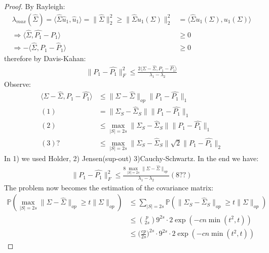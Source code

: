 \documentclass[a4paper,12pt, oneside, fleqn]{book}
\theoremstyle{definition}
\theoremstyle{remark}
\begin{document}
\begin{proof}
	By Rayleigh:
	\begin{align*}
		\lambda_{max}(\hat{\Sigma}) =  \langle \hat{\Sigma}\hat{u}_1, \hat{u}_1\rangle = \|\hat{\Sigma}\|_2^2 \ge \|\hat{\Sigma}u_1(\Sigma)\|_2^2 &= \langle \hat{\Sigma}u_1(\Sigma), u_1(\Sigma)\rangle \\
		\Rightarrow \langle\hat{\Sigma}, \hat{P_1}- P_1\rangle &\ge 0 \\
		\Rightarrow - \langle\hat{\Sigma}, P_1 - \hat{P}_1\rangle &\ge 0
	\end{align*}
	therefore by Davis-Kahan:
	\begin{align*}
		\|P_1 - \hat{P_1}\|_F^2 \le \frac{2\langle \Sigma - \hat{\Sigma}, P_1 - \hat{P_1}\rangle}{\lambda_1 - \lambda_2}
	\end{align*}
	Observe:
	\begin{align*}
		\langle \Sigma - \hat{\Sigma}, P_1 -\hat{P_1}\rangle &\le \|\Sigma - \hat{\Sigma}\|_{op} \|P_1 - \hat{P_1}\|_1\\
		(1)&= \|\Sigma_S - \hat{\Sigma}_S\|\|P_1 - \hat{P_1}\|_1\\
		(2)&\le  \max_{|S| = 2s}\|\Sigma_S - \hat{\Sigma}_S\|\|P_1 - \hat{P_1}\|_1\\
		(3)?&\le \max_{|S| = 2s}\|\Sigma_S - \hat{\Sigma}_S\|\sqrt{2}\|P_1 - \hat{P_1}\|_2
	\end{align*}
	In 1) we used Holder, 2) Jensen(sup-out) 3)Cauchy-Schwartz. In the end we have:
	\begin{align*}
		\|P_1 - \hat{P_1}\|_F^2 \le \frac{8\max_{|S| = 2s}\|\Sigma - \hat{\Sigma}\|_{op} }{\lambda_1 - \lambda_2} (8??)
	\end{align*}
	The problem now becomes the estimation of the covariance matrix:
	\begin{align*}
		\mathbb{P}(\max_{|S| = 2s}\|\Sigma - \hat{\Sigma}\|_{op} \ge t\|\Sigma\|_{op}) &\le \sum_{|S| = 2s}\mathbb{P}(\|\Sigma_S - \hat{\Sigma}_S\|_{op} \ge t \|\Sigma\|_{op})\\
		&\le \binom{p}{2s} 9^{2s} \cdot 2\exp(-cn\min(t^2,t))\\
		&\le \bigg(\frac{ep}{2s})^{2s} \cdot  9^{2s} \cdot 2\exp(-cn\min(t^2,t))
	\end{align*}
\end{proof}
\end{document}
